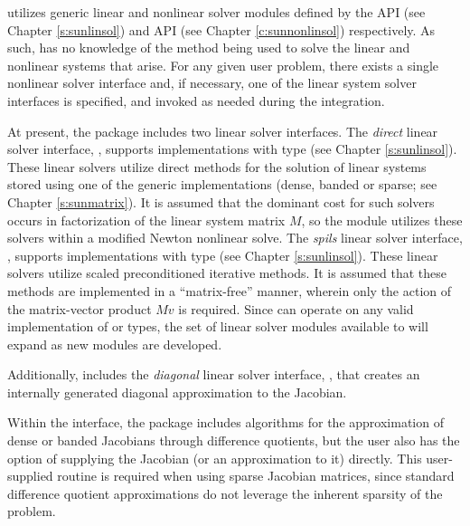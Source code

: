 {\cvode} utilizes generic linear and nonlinear solver modules defined by the
{\sunlinsol} API (see Chapter \ref{s:sunlinsol}) and {\sunnonlinsol} API (see
Chapter \ref{c:sunnonlinsol}) respectively. As such, {\cvode} has no knowledge
of the method being used to solve the linear and nonlinear systems that
arise. For any given user problem, there exists a single nonlinear solver
interface and, if necessary, one of the linear system solver interfaces is
specified, and invoked as needed during the integration.

At present, the package includes two linear solver interfaces.  The
{\em direct} linear solver interface, {\cvdls}, supports {\sunlinsol}
implementations with type  (see Chapter
\ref{s:sunlinsol}).  These linear solvers utilize direct methods for
the solution of linear systems stored using one of the {\sundials} generic
{\sunmatrix} implementations (dense, banded or sparse; see
Chapter \ref{s:sunmatrix}).  It is assumed that the dominant cost for
such solvers occurs in factorization of the linear system matrix $M$,
so the {\sunnonlinsolnewton} module utilizes these solvers within a modified
Newton nonlinear solve.
The {\em spils} linear solver interface, {\cvspils}, supports
{\sunlinsol} implementations with type 
(see Chapter \ref{s:sunlinsol}).  These linear solvers utilize scaled
preconditioned iterative methods.  It is assumed that these methods
are implemented in a ``matrix-free'' manner, wherein only the action
of the matrix-vector product $Mv$ is required.  Since {\cvode} can
operate on any valid {\sunlinsol} implementation of
 or  types, the set of
linear solver modules available to {\cvode} will expand as new
{\sunlinsol} modules are developed.

Additionally, {\cvode} includes the {\em diagonal} linear solver
interface, {\cvdiag}, that creates an internally generated diagonal
approximation to the Jacobian.

Within the {\cvdls} interface, the package includes algorithms for the
approximation of dense or banded Jacobians through difference 
quotients, but the user also has the option of supplying the Jacobian
(or an approximation to it) directly.  This user-supplied 
routine is required when using sparse Jacobian matrices, since
standard difference quotient approximations do not leverage the
inherent sparsity of the problem.

